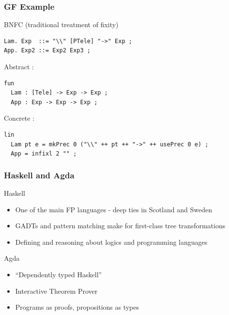 \documentclass{beamer}
\begin{document}
\begin{frame}[fragile]
\frametitle{GF Example}

BNFC (traditional treatment of fixity)

\begin{verbatim}
Lam. Exp  ::= "\\" [PTele] "->" Exp ;
App. Exp2 ::= Exp2 Exp3 ;
\end{verbatim}

Abstract :

\begin{verbatim}
fun
  Lam : [Tele] -> Exp -> Exp ;
  App : Exp -> Exp -> Exp ;
\end{verbatim}

Concrete :

\begin{verbatim}
lin
  Lam pt e = mkPrec 0 ("\\" ++ pt ++ "->" ++ usePrec 0 e) ;
  App = infixl 2 "" ;
\end{verbatim}
\end{frame}


\begin{frame}
\frametitle{Haskell and Agda}

\begin{exampleblock}{Haskell}
\begin{itemize}
\item One of the main FP languages - deep ties in Scotland and Sweden
\item GADTs and pattern matching make for first-class tree transformations
\item Defining and reasoning about logics and programming languages
\end{itemize}
\end{exampleblock}

\begin{exampleblock}{Agda}
\begin{itemize}
\item ``Dependently typed Haskell''
\item Interactive Theorem Prover
\item Programs as proofs, propositions as types
\end{itemize}

\end{exampleblock}
\end{frame}
\end{document}
